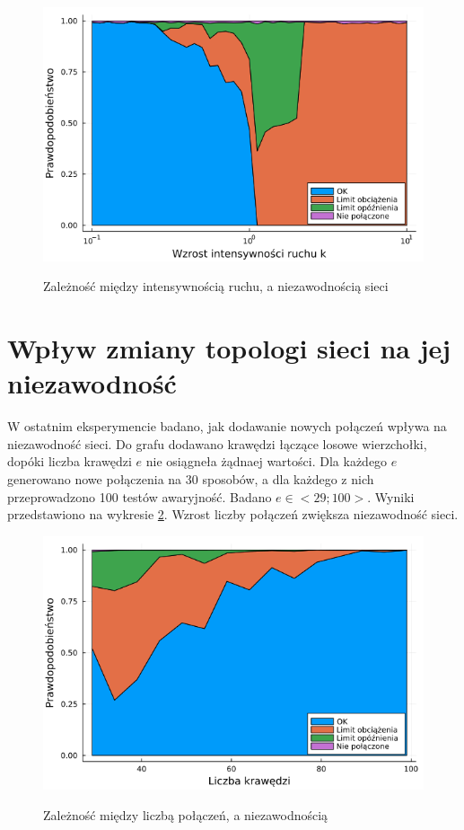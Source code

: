 \documentclass{article}
\begin{document}
    \begin{figure}[h]
        \centering
        \includegraphics[width=12cm]{../experiment_N.png}
        \label{fig:exp_n}
        \caption{Zależność między intensywnością ruchu, a niezawodnością sieci}
    \end{figure}

    \section{Wpływ zmiany topologi sieci na jej niezawodność}
    W ostatnim eksperymencie badano, jak dodawanie nowych połączeń wpływa na niezawodność sieci. Do grafu dodawano krawędzi łączące losowe wierzchołki, dopóki liczba krawędzi $e$ nie osiągneła żądnaej wartości. Dla każdego $e$ generowano nowe połączenia na 30 sposobów, a dla każdego z nich przeprowadzono 100 testów awaryjność. Badano $e \in <29; 100>$. Wyniki przedstawiono na wykresie \ref{fig:exp_topo}. Wzrost liczby połączeń zwiększa niezawodność sieci.

    \begin{figure}[h]
        \centering
        \includegraphics[width=12cm]{../experiment_topo.png}
        \label{fig:exp_topo}
        \caption{Zależność między liczbą połączeń, a niezawodnością}
    \end{figure}
\end{document}
